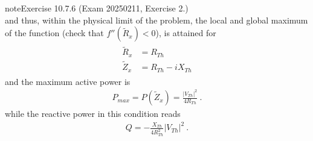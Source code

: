 \documentclass[letterpaper,10pt,italian]{jupyterBook}
\begin{document}
\begin{sphinxadmonition}{note}{Exercise 10.7.6 (Exam 2025\sphinxhyphen{}02\sphinxhyphen{}11, Exercise 2.)}
\begin{equation*}
\end{equation*}
\sphinxAtStartPar
and thus, within the physical limit of the problem, the local and global maximum of the function (check that \(f''(\widetilde{R}_x) < 0\)), is attained for
\begin{equation*}
\begin{split}\begin{aligned}
  \widetilde{R}_{x} & = R_{Th} \\
  \widetilde{Z}_{x} & = R_{Th} - i X_{Th}
\end{aligned}\end{split}
\end{equation*}
\sphinxAtStartPar
and the maximum active power is
\begin{equation*}
\begin{split}P_{max} = P(\widetilde{Z}_x) = \frac{|V_{Th}|^2}{4 R_{Th} } \ .\end{split}
\end{equation*}
\sphinxAtStartPar
while the reactive power in this condition reads
\begin{equation*}
\begin{split}Q = - \frac{ X_{Th} }{4 R^2_{Th}} |V_{Th}|^2 \ .\end{split}
\end{equation*}\end{sphinxadmonition}
 \label{exercise:exam-25-02-11-exe-03}
\end{document}
